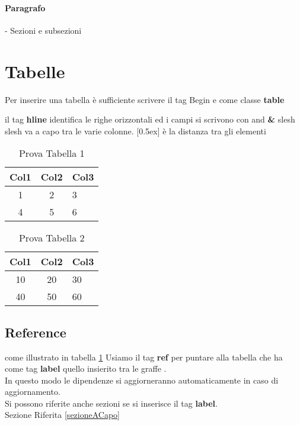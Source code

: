 \documentclass{article}
\begin{document}
\paragraph{Paragrafo} - Sezioni e subsezioni 

\section{Tabelle}
Per inserire una tabella è sufficiente scrivere il tag Begin e come classe \textbf{table}

 il tag \textbf{hline} identifica le righe orizzontali ed i campi si scrivono con and\textbf{ &}
    slesh slesh va a capo tra le varie colonne. [0.5ex] è la distanza tra gli elementi
\begin{table}
    \centering
    
    \begin{tabular}{c|c|l}
    \hline
    Col1 & Col2 & Col3 \\[0.5ex]
    \hline\hline
    1   &   2   &   3  \\
    4   &   5   &   6 \\ [5ex]
    \hline %
    \end{tabular}
    \caption{Prova Tabella 1}
    \label{TabellaUno}
\end{table}

\begin{table}
    \centering
    \begin{tabular}{c|c|l}
    \hline
    Col1 & Col2 & Col3 \\[0.5ex]
    \hline\hline
    10   &   20   &   30  \\
    40   &   50   &   60 \\ [5ex]
    \hline 
    \end{tabular}
    \caption{Prova Tabella 2}
    \label{TabellaDue}
\end{table}

\subsection{Reference}
come illustrato in tabella \ref{TabellaUno} Usiamo il tag \textbf{ref} per puntare alla tabella che ha come tag \textbf{label} quello insierito tra le graffe {}. 
\\In questo modo le dipendenze si aggiorneranno automaticamente in caso di aggiornamento.
\\Si possono riferite anche sezioni se si inserisce il tag \textbf{label}. 
\\Sezione Riferita \ref{sezioneACapo}
\end{document}
